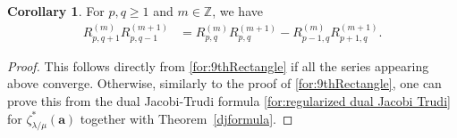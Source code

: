 \documentclass[12pt]{amsart}%
\theoremstyle{definition}
\newtheorem{cor}[theorem]{Corollary}
\newcommand{\ba}{\boldsymbol a}
\begin{document}
\begin{cor}
\label{square Schur MZV}
For $p,q\ge 1$ and $m\in\mathbb{Z}$, we have 
\begin{align}
\label{for:9thRectangle q}
R^{(m)}_{p,q+1}
R^{(m+1)}_{p,q-1}
&=R^{(m)}_{p,q}
R^{(m+1)}_{p,q}
-
R^{(m)}_{p-1,q}
R^{(m+1)}_{p+1,q}.
\end{align}
\end{cor}
\begin{proof}
This follows directly from \eqref{for:9thRectangle} if all the series appearing above converge.
Otherwise, similarly to the proof of \eqref{for:9thRectangle},
one can prove this from the  dual Jacobi-Trudi formula \eqref{for:regularized dual Jacobi Trudi}
for $\zeta^{\ast}_{\lambda/\mu}(\ba)$
together with Theorem~\ref{djformula}.
\end{proof}
\end{document}
